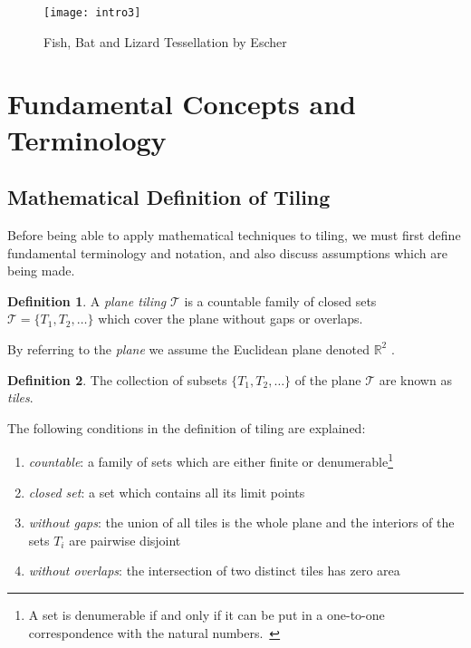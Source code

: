 \documentclass[a4paper,12pt,twoside,abstraction,titlepage]{article}
\theoremstyle{remark}
\theoremstyle{definition}
\newtheorem{definition}{Definition}[section]
\begin{document}
\begin{figure}[h]
\begin{center}
\texttt{[image: intro3]}
\caption{Fish, Bat and Lizard Tessellation by Escher~\cite{escher1}}
\end{center}
\end{figure}

\clearpage
\section{Fundamental Concepts and Terminology}
\subsection{Mathematical Definition of Tiling}

Before being able to apply mathematical techniques to tiling, we must first define fundamental terminology and notation, and also discuss assumptions which are being made.

\begin{definition}\label{tiling}
A \emph{plane tiling} $\mathscr{T}$ is a countable family of closed sets \\$\mathscr{T} = \{T_1, T_2, \ldots\}$ which cover the plane without gaps or overlaps.~\cite[\S 1.1]{branko}
\end{definition}

\noindent By referring to the \emph{plane} we assume the Euclidean plane denoted $\mathbb{R}^2$ .

\begin{definition}\label{tile}
The collection of subsets $\{T_1, T_2, \ldots\}$ of the plane $\mathscr{T}$ are known as \emph{tiles}.
\end{definition}
The following conditions in the definition of tiling are explained:

\begin{enumerate}
\item \emph{countable}: a family of sets which are either finite or denumerable\footnote{A set is denumerable if and only if it can be put in a one-to-one correspondence with the natural numbers.~\cite{wolfram}}~\cite{wolfram}
\item \emph{closed set}: a set which contains all its limit points~\cite{wolfram}
\item \emph{without gaps}: the union of all tiles is the whole plane and the interiors of the sets $T_i$ are pairwise disjoint~\cite[\S 1.1]{branko}
\item \emph{without overlaps}: the intersection of two distinct tiles has zero area
\end{enumerate}
\end{document}
